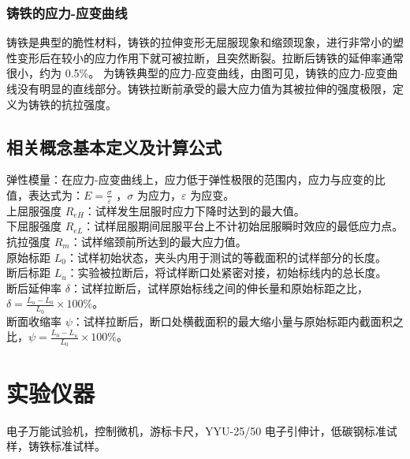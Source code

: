 \subsubsection{铸铁的应力-应变曲线}
铸铁是典型的脆性材料，铸铁的拉伸变形无屈服现象和缩颈现象，进行非常小的塑性变形后在较小的应力作用下就可被拉断，且突然断裂。拉断后铸铁的延伸率通常很小，约为 0.5\%。 为铸铁典型的应力-应变曲线，由图可见，铸铁的应力-应变曲线没有明显的直线部分。铸铁拉断前承受的最大应力值为其被拉伸的强度极限，定义为铸铁的抗拉强度。
\subsection{相关概念基本定义及计算公式}
\noindent 弹性模量：在应力-应变曲线上，应力低于弹性极限的范围内，应力与应变的比值，表达式为：\linebreak $E =\displaystyle \frac{\sigma}{\varepsilon}$ ，$\sigma$ 为应力，$\varepsilon$ 为应变。\\
上屈服强度 $R_{eH}$：试样发生屈服时应力下降时达到的最大值。\\
下屈服强度 $R_{eL}$：试样屈服期间屈服平台上不计初始屈服瞬时效应的最低应力点。\\
抗拉强度 $R_m$：试样缩颈前所达到的最大应力值。\\
原始标距 $L_0$：试样初始状态，夹头内用于测试的等截面积的试样部分的长度。\\
断后标距 $L_u$：实验被拉断后，将试样断口处紧密对接，初始标线内的总长度。\\
断后延伸率 $\delta$：试样拉断后，试样原始标线之间的伸长量和原始标距之比，$\delta = \displaystyle\frac{L_u-L_0}{L_0}\times 100\%$。\\
断面收缩率 $\psi$：试样拉断后，断口处横截面积的最大缩小量与原始标距内截面积之比，\linebreak $\psi = \displaystyle\frac{L_0-L_u}{L_0}\times 100\%$。
\section{实验仪器}%
电子万能试验机，控制微机，游标卡尺，YYU-25/50 电子引伸计，低碳钢标准试样，铸铁标准试样。

